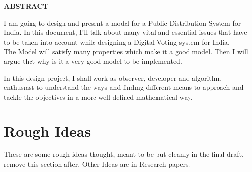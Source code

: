 \documentclass[12pt]{report}
\begin{document}
\newpage

\begin{center}
\Large \bf ABSTRACT
\end{center}
\vspace{0.2in}

I am going to design and present a model for a Public Distribution System for India. In this document, I'll talk about many vital and essential issues that have to be taken into account while designing a Digital Voting system for India. 
\\
\vspace{0.3cm}
The Model will satisfy many properties which make it a good model. Then I will argue thet why is it a very good model to be implemented.



In this design project, I shall work as observer, developer and algorithm enthusiast to understand the ways and finding different means to approach and tackle the objectives in a more well defined mathematical way. 

\vspace{0.2cm}

\newpage

\tableofcontents

\newpage


\chapter{Rough Ideas}
These are some rough ideas thought, meant to be put cleanly in the final draft, remove this section after.
Other Ideas are in Research papers.
\end{document}
